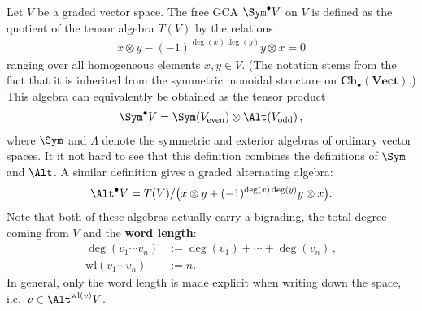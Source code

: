     \begin{example}\label{hda:symmetric_algebra}
        Let $V$ be a graded vector space. The free GCA $\Sym^\bullet V$ on $V$ is defined as the quotient of the tensor algebra $T(V)$ by the relations
        \begin{gather}
            x\otimes y-(-1)^{\deg(x)\deg(y)}y\otimes x=0
        \end{gather}
        ranging over all homogeneous elements $x,y\in V$. (The notation stems from the fact that it is inherited from the symmetric monoidal structure on $\mathbf{Ch}_\bullet(\mathbf{Vect})$.) This algebra can equivalently be obtained as the tensor product
        \begin{gather}
            \Sym^\bullet V = \Sym(V_\mathrm{even})\otimes\Alt(V_\mathrm{odd})\,,
        \end{gather}
        where $\Sym$ and $\Lambda$ denote the symmetric and exterior algebras of ordinary vector spaces. It it not hard to see that this definition combines the definitions of $\Sym$ and $\Alt$. A similar definition gives a graded alternating algebra:
        \begin{gather}
            \Alt^\bullet V = T(V)/\big(x\otimes y+(-1)^{\deg(x)\deg(y)}y\otimes x\big).
        \end{gather}
        Note that both of these algebras actually carry a bigrading, the total degree coming from $V$ and the \textbf{word length}:
        \begin{align}
            \deg(v_1\cdots v_n) &:= \deg(v_1)+\cdots+\deg(v_n)\,,\\
            \mathrm{wl}(v_1\cdots v_n) &:= n.
        \end{align}
        In general, only the word length is made explicit when writing down the space, i.e.~$v\in\Alt^{\mathrm{wl}(v)}V$.
    \end{example}
